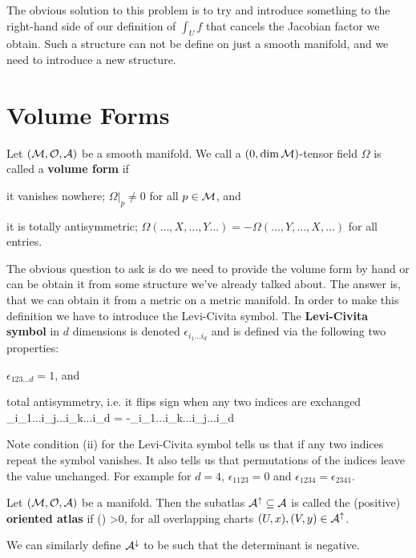 The obvious solution to this problem is to try and introduce something to the right-hand side of our definition of $\int_Uf$ that cancels the Jacobian factor we obtain. Such a structure can not be define on just a smooth manifold, and we need to introduce a new structure. 

\section{Volume Forms}

    Let $(\mathcal{M},\mathcal{O},\mathcal{A})$ be a smooth manifold. We call a $(0,\dim\mathcal{M})$-tensor field $\Omega$ is called a \textbf{volume form} if 
    \benr 
        \item it vanishes nowhere; $\Omega|_p \neq 0$ for all $p\in\mathcal{M}$, and
        \item it is totally antisymmetric; $\Omega(...,X,...,Y...) = - \Omega(...,Y,...,X,...)$ for all entries. 
    \een 
\ed 

The obvious question to ask is do we need to provide the volume form by hand or can be obtain it from some structure we've already talked about. The answer is, that we can obtain it from a metric on a metric manifold. In order to make this definition we have to introduce the Levi-Civita symbol. 
    The \textbf{Levi-Civita symbol} in $d$ dimensions is denoted $\epsilon_{i_1...i_d}$ and is defined via the following two properties:
    \benr 
        \item $\epsilon_{123...d} = 1$, and 
        \item total antisymmetry, i.e. it flips sign when any two indices are exchanged
        \bse 
            \epsilon_{i_1...i_j...i_k...i_d} = -\epsilon_{i_1...i_k...i_j...i_d}
        \ese 
    \een
\ed

\br 
    Note condition (ii) for the Levi-Civita symbol tells us that if any two indices repeat the symbol vanishes. It also tells us that permutations of the indices leave the value unchanged. For example for $d=4$, $\epsilon_{1123} = 0$ and $\epsilon_{1234}=\epsilon_{2341}$.
\er 

    Let $(\mathcal{M},\mathcal{O},\mathcal{A})$ be a manifold. Then the subatlas $\mathcal{A}^{\uparrow}\subseteq \mathcal{A}$ is called the (positive) \textbf{oriented atlas} if 
    \bse 
        \det\bigg(\bigg) >0,
    \ese 
    for all overlapping charts $(U,x),(V,y)\in\mathcal{A}^{\uparrow}$.
\ed 

We can similarly define $\mathcal{A}^{\downarrow}$ to be such that the determinant is negative.

